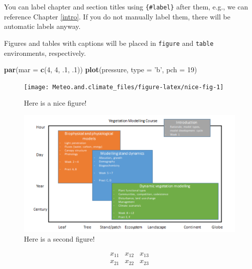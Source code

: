 \documentclass[oneside]{book}
\newenvironment{Shaded}{\begin{snugshade}}{\end{snugshade}}
\newcommand{\KeywordTok}[1]{\textcolor[rgb]{0.13,0.29,0.53}{\textbf{#1}}}
\newcommand{\DataTypeTok}[1]{\textcolor[rgb]{0.13,0.29,0.53}{#1}}
\newcommand{\DecValTok}[1]{\textcolor[rgb]{0.00,0.00,0.81}{#1}}
\newcommand{\StringTok}[1]{\textcolor[rgb]{0.31,0.60,0.02}{#1}}
\newcommand{\NormalTok}[1]{#1}
\begin{document}
You can label chapter and section titles using \texttt{\{\#label\}}
after them, e.g., we can reference Chapter \ref{intro}. If you do not
manually label them, there will be automatic labels anyway.

Figures and tables with captions will be placed in \texttt{figure} and
\texttt{table} environments, respectively.

\begin{Shaded}
\begin{Highlighting}[]
\KeywordTok{par}\NormalTok{(}\DataTypeTok{mar =} \KeywordTok{c}\NormalTok{(}\DecValTok{4}\NormalTok{, }\DecValTok{4}\NormalTok{, .}\DecValTok{1}\NormalTok{, .}\DecValTok{1}\NormalTok{))}
\KeywordTok{plot}\NormalTok{(pressure, }\DataTypeTok{type =} \StringTok{'b'}\NormalTok{, }\DataTypeTok{pch =} \DecValTok{19}\NormalTok{)}
\end{Highlighting}
\end{Shaded}

\begin{figure}

{\centering \texttt{[image: Meteo.and.climate\_files/figure-latex/nice-fig-1]} 

}

\caption{Here is a nice figure!}\label{fig:nice-fig}
\end{figure}

\begin{figure}

{\centering \includegraphics[width=0.8\linewidth]{figures/Figure_course} 

}

\caption{Here is a second figure!}\label{fig:nice-fig2}
\end{figure}

\[\begin{array}{ccc}
x_{11} & x_{12} & x_{13}\\
x_{21} & x_{22} & x_{23}
\end{array}\]
\end{document}
